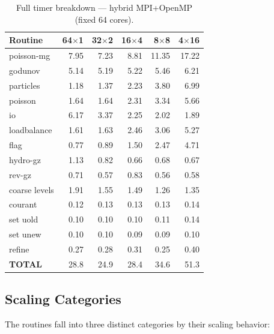 \documentclass[11pt,fleqn]{book}
\begin{document}
\begin{table}[htbp]
\caption{Full timer breakdown --- hybrid MPI+OpenMP (fixed 64 cores).}
\label{tab:routine-hybrid}
\begin{center}
\small
\begin{tabular}{lrrrrr}
\toprule
\textbf{Routine} & \textbf{64$\times$1} & \textbf{32$\times$2} & \textbf{16$\times$4} & \textbf{8$\times$8} & \textbf{4$\times$16} \\
\midrule
poisson-mg     &  7.95 &  7.23 &  8.81 & 11.35 & 17.22 \\
godunov        &  5.14 &  5.19 &  5.22 &  5.46 &  6.21 \\
particles      &  1.18 &  1.37 &  2.23 &  3.80 &  6.99 \\
poisson        &  1.64 &  1.64 &  2.31 &  3.34 &  5.66 \\
io             &  6.17 &  3.37 &  2.25 &  2.02 &  1.89 \\
loadbalance    &  1.61 &  1.63 &  2.46 &  3.06 &  5.27 \\
flag           &  0.77 &  0.89 &  1.50 &  2.47 &  4.71 \\
hydro-gz       &  1.13 &  0.82 &  0.66 &  0.68 &  0.67 \\
rev-gz         &  0.71 &  0.57 &  0.83 &  0.56 &  0.58 \\
coarse levels  &  1.91 &  1.55 &  1.49 &  1.26 &  1.35 \\
courant        &  0.12 &  0.13 &  0.13 &  0.13 &  0.14 \\
set uold       &  0.10 &  0.10 &  0.10 &  0.11 &  0.14 \\
set unew       &  0.10 &  0.10 &  0.09 &  0.09 &  0.10 \\
refine         &  0.27 &  0.28 &  0.31 &  0.25 &  0.40 \\
\midrule
\textbf{TOTAL} &  28.8 &  24.9 &  28.4 &  34.6 &  51.3 \\
\bottomrule
\end{tabular}
\end{center}
\end{table}

\subsection{Scaling Categories}

The routines fall into three distinct categories by their scaling behavior:
\end{document}
